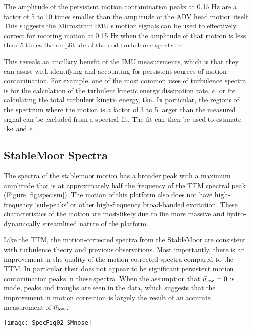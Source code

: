 The amplitude of the persistent motion contamination peaks at 0.15 Hz are a factor of 5 to 10 times smaller than the amplitude of the ADV head motion itself. This suggests the Microstrain IMU's motion signals can be used to effectively correct for mooring motion at 0.15 Hz when the amplitude of that motion is less than 5 times the amplitude of the real turbulence spectrum.

This reveals an ancillary benefit of the IMU measurements, which is that they can assist with identifying and accounting for persistent sources of motion contamination. For example, one of the most common uses of turbulence spectra is for the calculation of the turbulent kinetic energy dissipation rate, $\epsilon$, or for calculating the total turbulent kinetic energy, $\mathrm{tke}$. In particular, the regions of the spectrum where the motion is a factor of 3 to 5 larger than the measured signal can be excluded from a spectral fit. The fit can then be used to estimate $\mathrm{tke}$ and $\epsilon$. 

\subsection{StableMoor Spectra}

The spectra of the stablemoor motion has a broader peak with a maximum amplitude that is at approximately half the frequency of the TTM spectral peak (Figure \ref{fig:spec:sm}). The motion of this platform also does not have high-frequency `sub-peaks' or other high-frequency broad-banded excitation. These characteristics of the motion are most-likely due to the more massive and hydro-dynamically streamlined nature of the platform. 

Like the TTM, the motion-corrected spectra from the StableMoor are consistent with turbulence theory and previous observations. Most importantly, there is an improvement in the quality of the motion corrected spectra compared to the TTM. In particular their does not appear to be significant persistent motion contamination peaks in these spectra. When the assumption that $\vec{u}_\mathrm{low}=0$ is made, peaks and troughs are seen in the data, which suggests that the improvement in motion correction is largely the result of an accurate measurement of $\vec{u}_\mathrm{low}$.

\begin{figure*}[t]
  \centering
  \texttt{[image: SpecFig02\_SMnose]}
  \caption{Turbulence spectra from the StableMoor buoy. The axes-layout and annotations are identical to Figure \ref{fig:spec:ttm}.}
  \label{fig:spec:sm}
\end{figure*}

